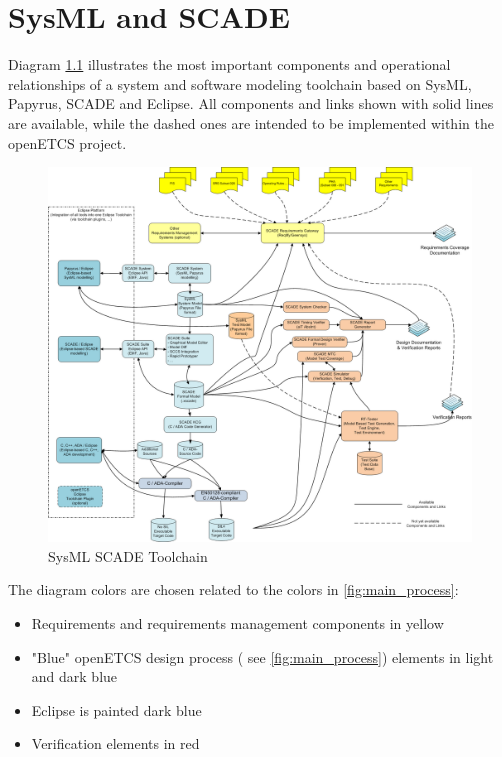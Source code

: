\chapter{SysML and SCADE}
\label{sec:sysML-Scade}

Diagram \ref{fig:SysML_SCADE_Toolchain} illustrates the most important components and operational relationships of a system and software modeling toolchain based on SysML, Papyrus, SCADE and Eclipse. 
All components and links shown with solid lines are available, while the dashed ones are intended to be implemented within the openETCS project. 


\begin{figure}[htbp]
	\centering
		\includegraphics[width=1.10\textwidth]{images/SysML_SCADE_Toolchain.png}
	\caption{SysML SCADE Toolchain}
	\label{fig:SysML_SCADE_Toolchain}
\end{figure}


The diagram colors are chosen related to the colors in \ref{fig:main_process}: 

\begin{itemize}
	\item Requirements and requirements management components in yellow
	\item "Blue" openETCS design process ( see \ref{fig:main_process}) elements in light and dark blue
	\item Eclipse is painted dark blue
	\item Verification elements in red
\end{itemize}

